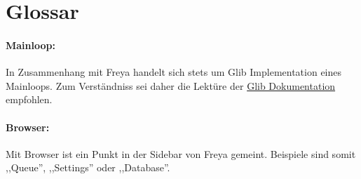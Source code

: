 \section{Glossar}
\paragraph{Mainloop:}
In Zusammenhang mit Freya handelt sich stets um Glib Implementation eines Mainloops.
Zum Verständniss sei daher die Lektüre der \href{http://developer.gnome.org/glib/2.30/glib-The-Main-Event-Loop.html#glib-The-Main-Event-Loop.description}{Glib Dokumentation} empfohlen.
\paragraph{Browser:}
Mit Browser ist ein Punkt in der Sidebar von Freya gemeint. Beispiele sind somit ,,Queue'', ,,Settings'' oder ,,Database''.

